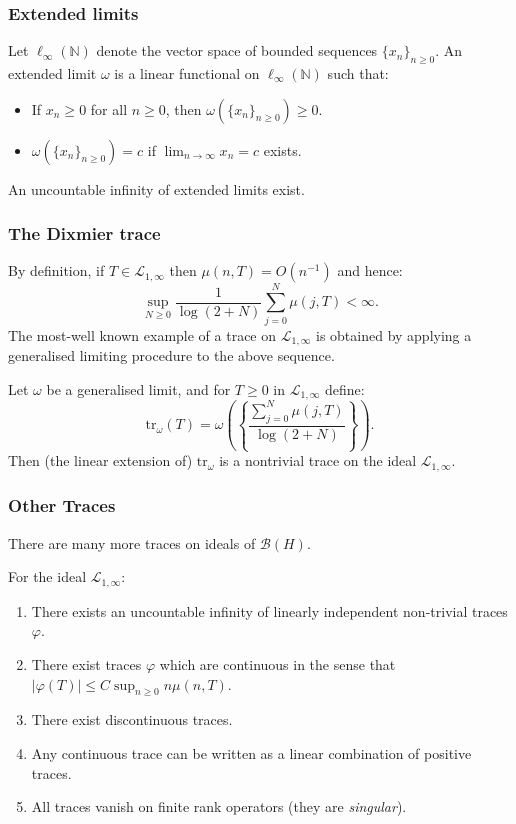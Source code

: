 \documentclass{beamer} %
\theoremstyle{definition} %
\newcommand{\Ntrl}{\mathbb{N}}
\newcommand{\Lc}{\mathcal{L}}
\newcommand{\tr}{\mathrm{tr}}
\begin{document}
\begin{frame}\frametitle{Extended limits}
    Let $\ell_\infty(\Ntrl)$ denote the vector space of bounded sequences $\{x_n\}_{n\geq 0}$. An extended limit $\omega$ is a linear functional on $\ell_\infty(\Ntrl)$ such that:
    \begin{itemize}
        \item{} If $x_n\geq 0$ for all $n\geq 0$, then $\omega(\{x_n\}_{n\geq 0}) \geq 0$.
        \item{} $\omega(\{x_n\}_{n\geq 0}) = c$ if $\lim_{n\to\infty} x_n = c$ exists.
    \end{itemize}
    An uncountable infinity of extended limits exist.
\end{frame}

\begin{frame}\frametitle{The Dixmier trace}
    By definition, if $T \in \Lc_{1,\infty}$ then $\mu(n,T) = O(n^{-1})$ and hence:
    \begin{equation*}
        \sup_{N\geq 0}\frac{1}{\log(2+N)}\sum_{j=0}^N \mu(j,T) < \infty.
    \end{equation*}
    The most-well known example of a trace on $\Lc_{1,\infty}$ is obtained by applying a generalised limiting procedure to the above sequence.
    
    Let $\omega$ be a generalised limit, and for $T \geq 0$ in $\Lc_{1,\infty}$ define:
    \begin{equation*}
        \tr_\omega(T) = \omega\left(\left\{\frac{\sum_{j=0}^N \mu(j,T)}{\log(2+N)}\right\}\right).
    \end{equation*}
    Then (the linear extension of) $\tr_\omega$ is a nontrivial trace on the ideal $\Lc_{1,\infty}$.
\end{frame}

\begin{frame}\frametitle{Other Traces}
    There are many more traces on ideals of $\mathcal{B}(H)$.
    
    For the ideal $\mathcal{L}_{1,\infty}$:
    \begin{enumerate}
        \item{} There exists an uncountable infinity of linearly independent non-trivial traces $\varphi$.
        \item{} There exist traces $\varphi$ which are continuous in the sense that $|\varphi(T)| \leq C\sup_{n\geq 0} n\mu(n,T)$.
        \item{} There exist discontinuous traces.
        \item{} Any continuous trace can be written as a linear combination of positive traces.
        \item{} All traces vanish on finite rank operators (they are \emph{singular}). 
    \end{enumerate} 
\end{frame}
\end{document}
